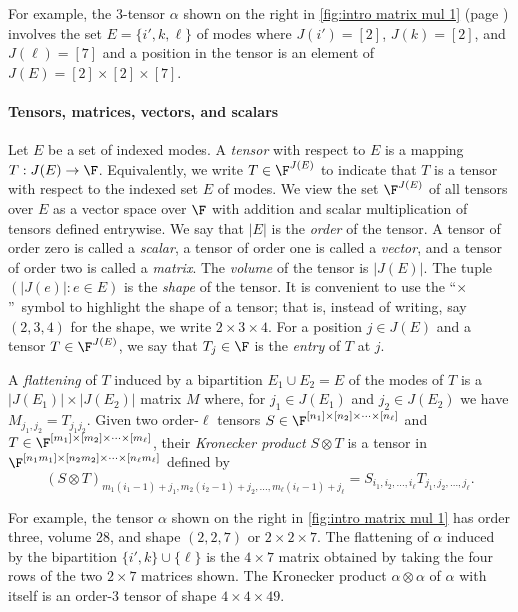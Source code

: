 For example, the $3$-tensor $\alpha$ shown on the right 
in \eqref{fig:intro matrix mul 1} (page \pageref{fig:intro matrix mul 1})
involves the %
set $E = \{i', k, \ell\}$ of modes  %
where $J(i') = [2]$,
$J(k) = [2]$, and $J(\ell) = [7]$ and a position in the tensor is an
element of $J(E) = [2] \times [2] \times [7]$.

\paragraph*{Tensors, matrices, vectors, and scalars}

\label{sect:tensor-def}

Let $E$ be a set of indexed modes. A \emph{tensor} with respect to $E$ is
a mapping $T:J(E)\rightarrow \F$. Equivalently, we write $T\in\F^{J(E)}$
to indicate that $T$ is a tensor with respect to the
%
indexed set $E$ of modes.  %
We view the set $\F^{J(E)}$ of all tensors over $E$ as a vector space over $\F$
with addition and scalar multiplication of tensors defined entrywise.
%
We say that $|E|$ is the \emph{order} of the tensor.  A tensor of order
zero is called a \emph{scalar}, a tensor of order one is called a 
\emph{vector}, and a tensor of order two is called a \emph{matrix}.
%
The \emph{volume} of the tensor is $|J(E)|$. The tuple $(|J(e)|:e\in E)$
is the \emph{shape} of the tensor. It is convenient to use the
%
``$\times$''~symbol  %
to %
%
highlight  %
the shape of a tensor; that is,
instead of writing, say $(2,3,4)$ for the shape, we write $2\times 3\times 4$.
For a position $j\in J(E)$ and a tensor $T\in\F^{J(E)}$,
we say that $T_j\in\F$ is the \emph{entry} of $T$ at $j$.


A \emph{flattening} of $T$ induced by a bipartition
%
%
%
$E_1 \cup E_2 = E$
%
of the modes of $T$ is a $|J(E_1)| \times |J(E_2)|$ matrix $M$ where, for $j_1 \in J(E_1)$ and $j_2 \in J(E_2)$ we have $M_{j_1,j_2} = T_{j_1j_2}$.
Given two %
order-$\ell$  %
tensors $S \in \F^{[n_1] \times [n_2] \times \cdots \times [n_\ell]}$ and $T \in \F^{[m_1] \times [m_2] \times \cdots \times [m_\ell]}$, their \emph{Kronecker product} $S \otimes T$ is a tensor in $\F^{[n_1 m_1] \times [n_2 m_2] \times \cdots \times [n_\ell m_\ell]}$ defined by
$$
(S \otimes T)_{m_1(i_1-1)+j_1,m_2(i_2-1)+j_2,\ldots,m_\ell(i_\ell-1)+j_\ell} = S_{i_1,i_2,\ldots,i_\ell} T_{j_1,j_2,\ldots,j_\ell}.
$$

For example, the tensor $\alpha$ shown on the right in \eqref{fig:intro matrix mul 1} has
order three, volume $28$, and shape $(2,2,7)$ or $2 \times 2 \times
7$.  The flattening of $\alpha$ induced by the bipartition $\{i', k\}
\cup \{\ell\}$ is the $4 \times 7$ matrix obtained by taking the four
rows of the two $2\times7$ matrices shown.  The Kronecker product
$\alpha \otimes \alpha$ of $\alpha$ with itself is an
%
order-3   %
tensor of shape $4 \times 4 \times 49$.


